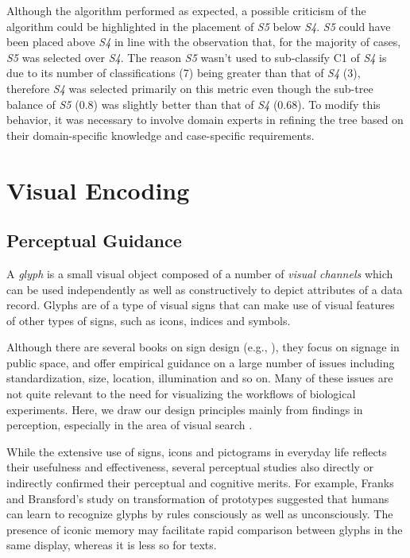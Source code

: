 Although the algorithm performed as expected, a possible criticism of the algorithm could be highlighted in the placement of \emph{S5} below \emph{S4}. \emph{S5} could have been placed above \emph{S4} in line with the observation that, for the majority of cases, \emph{S5} was selected over \emph{S4}. The reason \emph{S5} wasn't used to sub-classify C1 of \emph{S4} is due to its number of classifications (7) being greater than that of \emph{S4} (3), therefore \emph{S4} was selected primarily on this metric even though the sub-tree balance of \emph{S5} (0.8) was slightly better than that of \emph{S4} (0.68). To modify this behavior, it was necessary to involve domain experts in refining the tree based on their domain-specific knowledge and case-specific requirements.


%

\section{Visual Encoding}
\label{sec:Glyphs}
\subsection{Perceptual Guidance}
%
A \emph{glyph} is a small visual object composed of a number of \emph{visual channels} which can be used independently as well as constructively to depict attributes of a data record.
Glyphs are of a type of visual signs that can make use of visual features of other types of signs, such as icons, indices and symbols.

Although there are several books on sign design (e.g., \cite{barker00,abdullah06}), they focus on signage in public space, and offer empirical guidance on a large number of issues including standardization, size, location, illumination and so on.
Many of these issues are not quite relevant to the need for visualizing the workflows of biological experiments. Here, we draw our design principles mainly from findings in perception, especially in the area of visual search \cite{spoehr82,quinlan03}.

While the extensive use of signs, icons and pictograms in everyday life reflects their usefulness and effectiveness, several perceptual studies also directly or indirectly confirmed their perceptual and cognitive merits.
For example, Franks and Bransford's study on transformation of prototypes \cite{franks71} suggested that humans can learn to recognize glyphs by rules consciously as well as unconsciously.
The presence of iconic memory \cite{sperling60} may facilitate rapid comparison between glyphs in the same display, whereas it is less so for texts.


